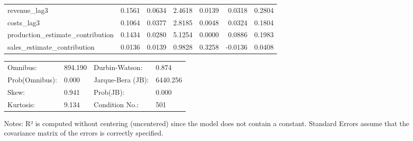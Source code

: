 \begin{table}
\begin{center}
\begin{tabular}{lrrrrrr}
revenue\_lag3                      &  0.1561 &   0.0634 &  2.4618 &      0.0139 &  0.0318 &  0.2804  \\
costs\_lag3                        &  0.1064 &   0.0377 &  2.8185 &      0.0048 &  0.0324 &  0.1804  \\
production\_estimate\_contribution &  0.1434 &   0.0280 &  5.1254 &      0.0000 &  0.0886 &  0.1983  \\
sales\_estimate\_contribution      &  0.0136 &   0.0139 &  0.9828 &      0.3258 & -0.0136 &  0.0408  \\
\hline
\end{tabular}
\end{center}

\begin{center}
\begin{tabular}{llll}
\hline
Omnibus:       & 894.190 & Durbin-Watson:    & 0.874     \\
Prob(Omnibus): & 0.000   & Jarque-Bera (JB): & 6440.256  \\
Skew:          & 0.941   & Prob(JB):         & 0.000     \\
Kurtosis:      & 9.134   & Condition No.:    & 501       \\
\hline
\end{tabular}
\end{center}
\end{table}
\bigskip
Notes: \newline 
[1] R² is computed without centering (uncentered) since the                 model does not contain a constant. \newline 
[2] Standard Errors assume that the covariance matrix of the errors is correctly specified.